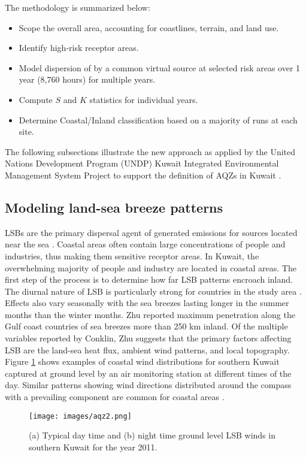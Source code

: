 The methodology is summarized below:
\begin{itemize}
\item Scope the overall area, accounting for coastlines, terrain, and land use.
\item Identify high-risk receptor areas.
\item Model dispersion of by a common virtual source at selected risk areas over 1 year (8,760 hours) for multiple years.
\item Compute $S$ and $K$ statistics for individual years.
\item Determine Coastal/Inland classification based on a majority of runs at each site.
\end{itemize}

The following subsections illustrate the new approach as applied by the United Nations Development Program (UNDP) Kuwait Integrated Environmental Management System Project to support the definition of AQZs in Kuwait \citep{Freeman2013}.  

\subsection{Modeling land-sea breeze patterns}

LSBs are the primary dispersal agent of generated emissions for sources located near the sea \citep{Cuxart2014}.  Coastal areas often contain large concentrations of people and industries, thus making them sensitive receptor areas.  In Kuwait, the overwhelming majority of people and industry are located in coastal areas.  The first step of the process is to determine how far LSB patterns encroach inland.  The diurnal nature of LSB is particularly strong for countries in the study area \citep{Zhu2004}.  Effects also vary seasonally with the sea breezes lasting longer in the summer months than the winter months.  Zhu reported maximum penetration along the Gulf coast countries of sea breezes more than 250 km inland.  Of the multiple variables reported by Conklin, Zhu suggests that the primary factors affecting LSB are the land-sea heat flux, ambient wind patterns, and local topography.  Figure \ref{fig:LSBwinds} shows examples of coastal wind distributions for southern Kuwait captured at ground level by an air monitoring station at different times of the day.  Similar patterns showing wind directions distributed around the compass with a prevailing component are common for coastal areas \citep{Lozano2013}.

%
\begin{figure}[H]
\centering
\texttt{[image: images/aqz2.png]} 
\caption[Typical LSB winds for Kuwait]{(a) Typical day time and (b) night time ground level LSB winds in southern Kuwait for the year 2011.}
\label{fig:LSBwinds}
\end{figure}
% 
